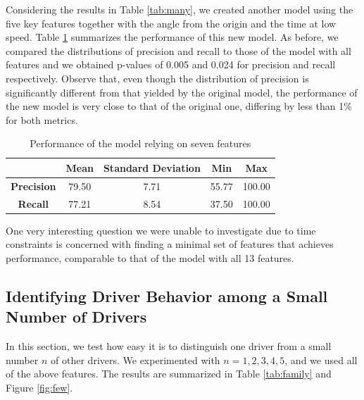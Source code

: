 \documentclass{article}
\begin{document}
Considering the results in Table \ref{tab:many}, we created another model using the five key features together with the angle from the origin and the time at low speed. Table \ref{tab:red2} summarizes the performance of this new model. As before, we compared the distributions of precision and recall to those of the model with all features and we obtained p-values of 0.005 and 0.024 for precision and recall respectively. Observe that, even though the distribution of precision is significantly different from that yielded by the original model, the performance of the new model is very close to that of the original one, differing by less than 1\% for both metrics.

\begin{table}[h]
\centering
\begin{tabular}{|c|c|c|c|c|} \hline
& {\bf Mean} & {\bf Standard Deviation} & {\bf Min} & {\bf Max} \\ \hline
{\bf Precision} &79.50 &7.71 &55.77 & 100.00 \\ \hline 
{\bf Recall} &77.21 & 8.54& 37.50& 100.00\\ \hline
\end{tabular}
\caption{Performance of the model relying on seven features}
\label{tab:red2}
\end{table}

One very interesting question we were unable to investigate due to time constraints is concerned with finding a minimal set of features that achieves performance, comparable to that of the model with all 13 features.

\subsection{Identifying Driver Behavior among a Small Number of Drivers} %

In this section, we test how easy it is to distinguish one driver from a small number $n$ of other drivers. We experimented with $n = 1,2,3,4,5$, and we used all of the above features. The results are summarized in Table \ref{tab:family} and Figure \ref{fig:few}.
\end{document}
